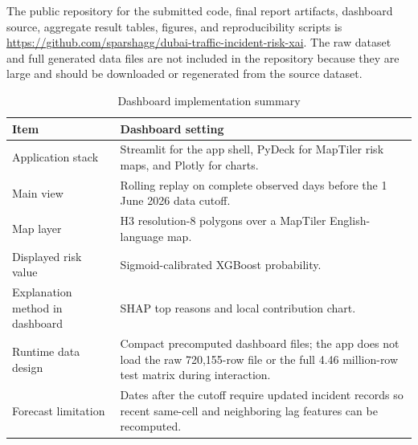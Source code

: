 The public repository for the submitted code, final report artifacts, dashboard source, aggregate result tables, figures, and reproducibility scripts is \url{https://github.com/sparshagg/dubai-traffic-incident-risk-xai}. The raw dataset and full generated data files are not included in the repository because they are large and should be downloaded or regenerated from the source dataset.

\begin{table}[H]
\centering
\caption{Dashboard implementation summary}
\label{tab:appendix_dashboard_summary}
\small
\begin{tabularx}{\textwidth}{L{0.32\textwidth}Y}
\toprule
\textbf{Item} & \textbf{Dashboard setting} \\
\midrule
Application stack & Streamlit for the app shell, PyDeck for MapTiler risk maps, and Plotly for charts. \\
Main view & Rolling replay on complete observed days before the 1 June 2026 data cutoff. \\
Map layer & H3 resolution-8 polygons over a MapTiler English-language map. \\
Displayed risk value & Sigmoid-calibrated XGBoost probability. \\
Explanation method in dashboard & SHAP top reasons and local contribution chart. \\
Runtime data design & Compact precomputed dashboard files; the app does not load the raw 720,155-row file or the full 4.46 million-row test matrix during interaction. \\
Forecast limitation & Dates after the cutoff require updated incident records so recent same-cell and neighboring lag features can be recomputed. \\
\bottomrule
\end{tabularx}
\end{table}
